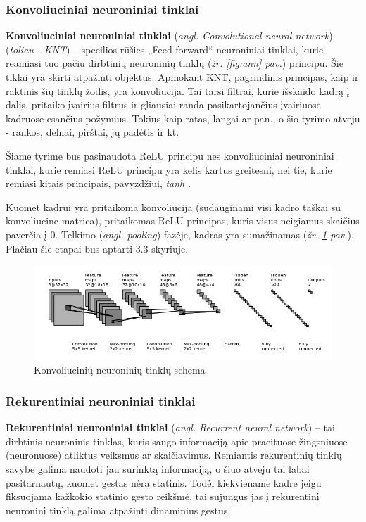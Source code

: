 \documentclass{VUMIFInfKursinis}
\begin{document}
\subsubsection{Konvoliuciniai neuroniniai tinklai}
\textbf{Konvoliuciniai neuroniniai tinklai} (\textit{angl. Convolutional neural network}) (\textit{toliau - KNT}) – specilios rūšies „Feed-forward“ neuroniniai tinklai, kurie reamiasi tuo pačiu dirbtinių neuroninių tinklų (\textit{žr. \ref{fig:ann} pav.}) principu. Šie tiklai yra skirti atpažinti objektus. Apmokant KNT, pagrindinis principas, kaip ir raktinis šių tinklų žodis, yra konvoliucija. Tai tarsi filtrai, kurie išskaido kadrą į dalis, pritaiko įvairius filtrus ir gliausiai randa pasikartojančius įvairiuose kadruose esančius požymius. Tokius kaip ratas, langai ar pan., o šio tyrimo atveju - rankos, delnai, pirštai, jų padėtis ir kt.

Šiame tyrime bus pasinaudota ReLU principu nes konvoliuciniai neuroniniai tinklai, kurie remiasi ReLU principu yra kelis kartus greitesni, nei tie, kurie remiasi kitais principais, pavyzdžiui, \textit{tanh} \cite{NIPS2012_4824}. 

Kuomet kadrui yra pritaikoma konvoliucija (sudauginami visi kadro taškai su konvoliucine matrica), pritaikomas ReLU principas, kuris visus neigiamus skaičius paverčia į 0. Telkimo (\textit{angl. pooling}) fazėje, kadras yra sumažinamas (\textit{žr. \ref{img:cnn} pav.}). Plačiau šie etapai bus aptarti 3.3 skyriuje.

\begin{figure}[H]
	\centering
	\includegraphics[width=.8\linewidth]{img/cnn}
	\caption[]{Konvoliucinių neuroninių tinklų schema\footnotemark}
	\label{img:cnn}
\end{figure}


\subsubsection{Rekurentiniai neuroniniai tinklai}
\textbf{Rekurentiniai neuroniniai tinklai} (\textit{angl. Recurrent neural network}) – tai dirbtinis neuroninis tinklas, kuris saugo informaciją apie praeituose žingsniuose (neuronuose) atliktus veiksmus ar skaičiavimus. Remiantis rekurentinių tinklų savybe galima naudoti jau surinktą informaciją, o šiuo atveju tai labai pasitarnautų, kuomet gestas nėra statinis. Todėl kiekviename kadre jeigu fiksuojama kažkokio statinio gesto reikšmė, tai sujungus jas į rekurentinį neuroninį tinklą galima atpažinti dinaminius gestus.
\end{document}
